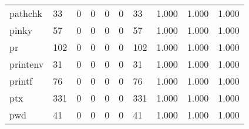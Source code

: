 \begin{longtable}{lp{2.0cm}p{2.0cm}p{2.0cm}p{2.0cm}p{2.0cm}p{2.0cm}p{2.0cm}p{2.0cm}p{2.0cm}}
pathchk   &                     33 &                                             0 &                                            0 &                                           0 &                                            0 &                                         33 &                                1.000 &                                  1.000 &                                1.000 \\
pinky     &                     57 &                                             0 &                                            0 &                                           0 &                                            0 &                                         57 &                                1.000 &                                  1.000 &                                1.000 \\
pr        &                    102 &                                             0 &                                            0 &                                           0 &                                            0 &                                        102 &                                1.000 &                                  1.000 &                                1.000 \\
printenv  &                     31 &                                             0 &                                            0 &                                           0 &                                            0 &                                         31 &                                1.000 &                                  1.000 &                                1.000 \\
printf    &                     76 &                                             0 &                                            0 &                                           0 &                                            0 &                                         76 &                                1.000 &                                  1.000 &                                1.000 \\
ptx       &                    331 &                                             0 &                                            0 &                                           0 &                                            0 &                                        331 &                                1.000 &                                  1.000 &                                1.000 \\
pwd       &                     41 &                                             0 &                                            0 &                                           0 &                                            0 &                                         41 &                                1.000 &                                  1.000 &                                1.000 \\

\end{longtable}
